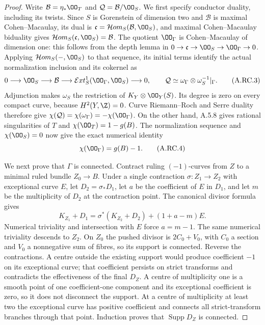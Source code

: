\begin{proof}
Write $\mathcal B=\eta_*\OO_T$ and
$\mathcal Q=\mathcal B/\OO_S$. We first specify conductor
duality, including its twists. Since $S$ is Gorenstein of
dimension two and $\mathcal B$ is maximal Cohen--Macaulay,
its dual is $\mathfrak c=\mathcal Hom_S(\mathcal B,\OO_S)$,
and maximal Cohen--Macaulay biduality gives
$\mathcal Hom_S(\mathfrak c,\OO_S)=\mathcal B$.
The quotient $\OO_\Gamma$ is Cohen--Macaulay of dimension one:
this follows from the depth lemma in
$0\to\mathfrak c\to\OO_S\to\OO_\Gamma\to0$.
Applying $\mathcal Hom_S(-,\OO_S)$ to that sequence, its
initial terms identify the actual normalization inclusion and
its cokernel as
\[
 0\longrightarrow\OO_S\longrightarrow\mathcal B
 \longrightarrow
 \mathcal Ext^1_S(\OO_\Gamma,\OO_S)\longrightarrow0,
 \qquad
 \mathcal Q\simeq\omega_\Gamma\otimes\omega_S^{-1}|_\Gamma.
                                                               \tag{A.RC.3}
\]
Adjunction makes $\omega_S$ the restriction of
$K_Y\otimes\OO_Y(S)$. Its degree is zero on every compact
curve, because $H^2(Y,\Z)=0$. Curve Riemann--Roch and Serre
duality therefore give
$\chi(\mathcal Q)=\chi(\omega_\Gamma)=-\chi(\OO_\Gamma)$.
On the other hand, A.5.8 gives rational singularities of $T$
and $\chi(\OO_T)=1-g(B)$. The normalization sequence and
$\chi(\OO_S)=0$ now give the exact numerical identity
\[
                   \chi(\OO_\Gamma)=g(B)-1.          \tag{A.RC.4}
\]

We next prove that $\Gamma$ is connected. Contract ruling
$(-1)$-curves from $Z$ to a minimal ruled bundle $Z_0\to B$.
Under a single contraction $\sigma:Z_1\to Z_2$ with exceptional
curve $E$, let $D_2=\sigma_*D_1$, let $a$ be the coefficient
of $E$ in $D_1$, and let $m$ be the multiplicity of $D_2$ at
the contraction point. The canonical divisor formula gives
\[
 K_{Z_1}+D_1=\sigma^*(K_{Z_2}+D_2)+(1+a-m)E.
                                                               \tag{A.RC.5}
\]
Numerical triviality and intersection with $E$ force $a=m-1$.
The same numerical triviality descends to $Z_2$. On $Z_0$
the pushed divisor is $2C_0+V_0$, with $C_0$ a section and
$V_0$ a nonnegative sum of fibres, so its support is connected.
Reverse the contractions. A centre outside the existing support
would produce coefficient $-1$ on its exceptional curve; that
coefficient persists on strict transforms and contradicts the
effectiveness of the final $D_Z$. A centre of multiplicity one
is a smooth point of one coefficient-one component and its
exceptional coefficient is zero, so it does not disconnect the
support. At a centre of multiplicity at least two the exceptional
curve has positive coefficient and connects all strict-transform
branches through that point. Induction proves that
$\operatorname{Supp}D_Z$ is connected.


\end{proof}
